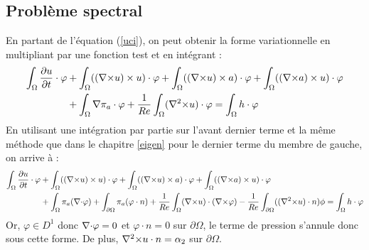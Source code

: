 \subsection{Problème spectral}
\label{spectre}

En partant de l'équation (\ref{uci}), on peut obtenir la forme variationnelle en multipliant par une fonction test et en intégrant :
\begin{align*}
\int_\Omega \frac{\partial u}{\partial t}\cdot \varphi &+ \int_\Omega (({\nabla\times} u)\times u)\cdot \varphi + \int_\Omega (({\nabla\times} u)\times a)\cdot\varphi + \int_\Omega (({\nabla\times} a)\times u)\cdot\varphi \\
&+ \int_\Omega {\nabla}\pi_a\cdot\varphi + \frac{1}{Re}\int_\Omega ({\nabla^2\times} u)\cdot\varphi = \int_\Omega h\cdot\varphi
\end{align*}
En utilisant une intégration par partie sur l'avant dernier terme et la même méthode que dans le chapitre \ref{eigen} pour le dernier terme du membre de gauche, on arrive à :
\begin{align*}
\int_\Omega \frac{\partial u}{\partial t}\cdot \varphi &+ \int_\Omega (({\nabla\times} u)\times u)\cdot \varphi + \int_\Omega (({\nabla\times} u)\times a)\cdot\varphi + \int_\Omega (({\nabla\times} a)\times u)\cdot\varphi\\ 
&+ \int_\Omega \pi_a({\nabla\cdot}\varphi) + \int_{\partial \Omega} \pi_a(\varphi\cdot n) + \frac{1}{Re}\int_\Omega ({\nabla\times} u)\cdot({\nabla\times}\varphi) -\frac{1}{Re}\int_{\partial\Omega} (({\nabla^2\times} u)\cdot n)\phi = \int_\Omega h\cdot\varphi
\end{align*}
Or, $\varphi\in D^1$ donc ${\nabla\cdot}\varphi=0$ et $\varphi\cdot n=0$ sur $\partial\Omega$, le terme de pression s'annule donc sous cette forme. De plus, ${\nabla^2\times} u\cdot n=\alpha_2$ sur $\partial\Omega$.\\


